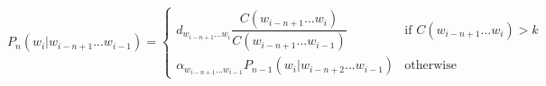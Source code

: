\[
P_{n}\left( w_i | w_{i-n+1}...w_{i-1} \right) = 
\begin{cases}
d_{w_{i-n+1}...w_i} \dfrac{C(w_{i-n+1}...w_i)}{C(w_{i-n+1}...w_{i-1})} &\text{if $C(w_{i-n+1}...w_i) > k$}\\
\alpha_{w_{i-n+1}...w_{i-1}} P_{n - 1}\left( w_i | w_{i-n+2}...w_{i-1} \right) &\text{otherwise}
\end{cases}
\]


\subsection{  }
